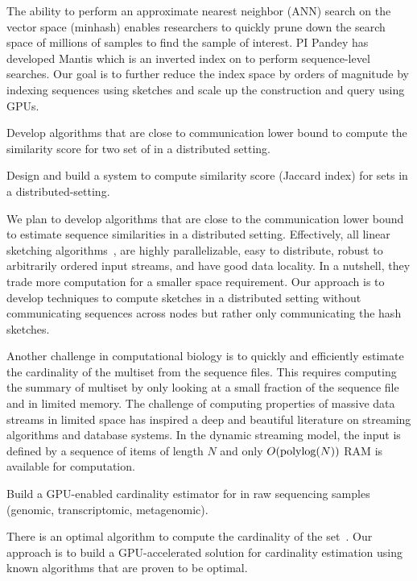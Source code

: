 The ability to perform an approximate nearest neighbor (ANN) search on the vector space (minhash) enables researchers to quickly prune down the search space of millions of samples to find the sample of interest. PI Pandey has developed Mantis which is an inverted index on \kmers to perform sequence-level searches. Our goal is to further reduce the index space by orders of magnitude by indexing sequences using sketches and scale up the construction and query using GPUs.

\begin{rproblem}
Develop algorithms that are close to communication lower bound to compute the similarity score for two set of \kmers in a distributed setting.
\end{rproblem}

\begin{rproblem}
Design and build a system to compute similarity score (Jaccard index) for \kmer sets in a distributed-setting.
\end{rproblem}

We plan to develop algorithms that are close to the communication lower bound to estimate sequence similarities in a distributed setting. Effectively, all linear sketching algorithms~\cite{li2014sketchuniversal}, are highly parallelizable, easy to distribute, robust to arbitrarily ordered input streams, and have good data locality. In a nutshell, they trade more computation for a smaller space requirement. Our approach is to develop techniques to compute sketches in a distributed setting without communicating sequences across nodes but rather only communicating the hash sketches.

Another challenge in computational biology is to quickly and efficiently estimate the cardinality of the \kmer multiset from the sequence files. This requires computing the summary of \kmer multiset by only looking at a small fraction of the sequence file and in limited memory.
%
The challenge of computing properties of massive data streams in limited space has inspired a deep and beautiful literature on streaming algorithms and database systems. In the dynamic streaming model, the input is defined by a sequence of items of length $N$ and only $O(\textrm{polylog}{(N)})$ {RAM} is available for computation.


\begin{rproblem}
Build a GPU-enabled cardinality estimator for \kmers in raw sequencing samples (genomic, transcriptomic, metagenomic).
\end{rproblem}

There is an optimal algorithm to compute the cardinality of the set~\cite{Kane2010}.
Our approach is to build a GPU-accelerated solution for cardinality estimation using known algorithms that are proven to be optimal.